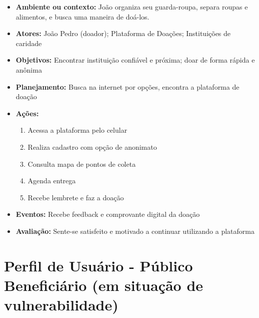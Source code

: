 \documentclass[a4paper,12pt]{article}
\begin{document}
\begin{itemize}
    \item \textbf{Ambiente ou contexto:} João organiza seu guarda-roupa, separa roupas e alimentos, e busca uma maneira de doá-los.
    \item \textbf{Atores:} João Pedro (doador); Plataforma de Doações; Instituições de caridade
    \item \textbf{Objetivos:} Encontrar instituição confiável e próxima; doar de forma rápida e anônima
    \item \textbf{Planejamento:} Busca na internet por opções, encontra a plataforma de doação
    \item \textbf{Ações:} 
    \begin{enumerate}
        \item Acessa a plataforma pelo celular
        \item Realiza cadastro com opção de anonimato
        \item Consulta mapa de pontos de coleta
        \item Agenda entrega
        \item Recebe lembrete e faz a doação
    \end{enumerate}
    \item \textbf{Eventos:} Recebe feedback e comprovante digital da doação
    \item \textbf{Avaliação:} Sente-se satisfeito e motivado a continuar utilizando a plataforma
\end{itemize}

\newpage

\section{Perfil de Usuário - Público Beneficiário (em situação de vulnerabilidade)}
\end{document}
